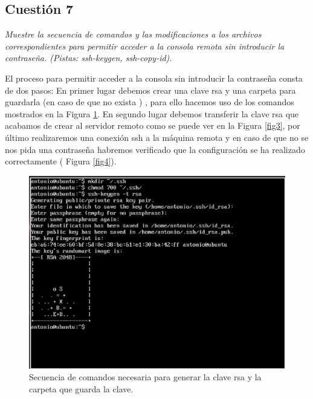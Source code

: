 \subsection{Cuestión 7}
\textit{Muestre la secuencia de comandos y las modificaciones a los archivos correspondientes para permitir acceder a la consola remota sin introducir la contraseña. (Pistas: ssh-keygen, ssh-copy-id).}
\newline

El proceso para permitir acceder a la consola sin introducir la contraseña consta de dos pasos: En primer lugar debemos crear una clave rsa y una carpeta para guardarla (en caso de que no exista ) , para ello hacemos uso de los comandos mostrados en la Figura \ref{fig2}. En segundo lugar debemos transferir la clave rsa que acabamos de crear al servidor remoto como se puede ver en la Figura \ref{fig3}, por último realizaremos una conexión ssh a la máquina remota y en caso de que no se nos pida una contraseña habremos verificado que la configuración se ha realizado correctamente ( Figura \ref{fig4}). \cite{passssh}

\begin{figure}[H]
    \begin{center}
        \includegraphics[scale=0.45]{imagenes/img2.eps}
        \caption{Secuencia de comandos necesaria para generar la clave rsa y la carpeta que guarda la clave.}
        \label{fig2}
    \end{center}
\end{figure}

